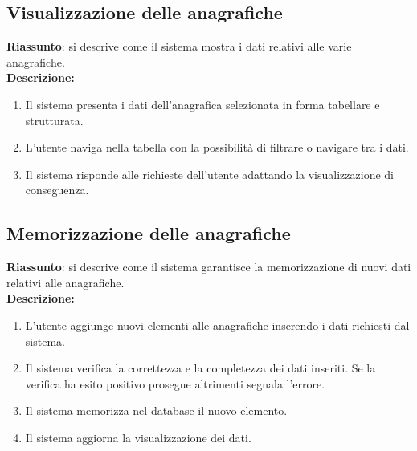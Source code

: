 \subsection{Visualizzazione delle anagrafiche}
\textbf{Riassunto}: si descrive come il sistema mostra i dati relativi alle varie anagrafiche.\\
\textbf{Descrizione:}
\begin{enumerate}
  \item Il sistema presenta i dati dell'anagrafica selezionata in forma tabellare e strutturata.
  \item L'utente naviga nella tabella con la possibilità di filtrare o navigare tra i dati.
  \item Il sistema risponde alle richieste dell'utente adattando la visualizzazione di conseguenza.
\end{enumerate}

\subsection{Memorizzazione delle anagrafiche}
\textbf{Riassunto}: si descrive come il sistema garantisce la memorizzazione di nuovi dati relativi alle anagrafiche.\\
\textbf{Descrizione:}
\begin{enumerate}
  \item L'utente aggiunge nuovi elementi alle anagrafiche inserendo i dati richiesti dal sistema.
  \item Il sistema verifica la correttezza e la completezza dei dati inseriti. Se la verifica ha esito positivo prosegue altrimenti segnala l'errore.
  \item Il sistema memorizza nel database il nuovo elemento.
  \item Il sistema aggiorna la visualizzazione dei dati.
\end{enumerate}

